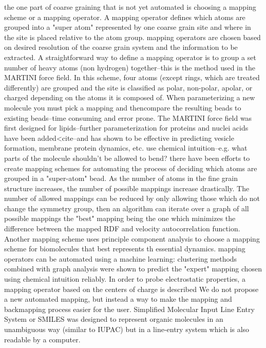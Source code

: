 the one part of coarse graining that is not yet automated is choosing a mapping scheme or a mapping operator. A mapping operator defines which atoms are grouped into a "super atom" represented by one coarse grain site and where in the site is placed relative to the atom group.
mapping operators are chosen based on desired resolution of the coarse grain system and the information to be extracted. 
A straightforward way to define a mapping operator is to group a set number of heavy atoms (non hydrogen) together--this is the method used in the MARTINI force field. \cite{Marrink2007} In this scheme, four atoms (except rings, which are treated differently) are grouped and the site is classified as polar, non-polar, apolar, or charged depending on the atoms it is composed of. When parameterizing a new molecule you must pick a mapping and thencompare the resulting beads to existing beads--time consuming and error prone.\cite{http://www.cgmartini.nl/index.php/tutorials-general-introduction-gmx5/parametrzining-new-molecule-gmx5} The MARTINI force field was first designed for lipids--further parameterization for proteins and nuclei acids have been added<cite--and has shown to be effective in predicting vesicle formation, membrane protein dynamics, etc.
use chemical intuition--e.g. what parts of the molecule shouldn't be allowed to bend?
there have been efforts to create mapping schemes for automating the process of deciding which atoms are grouped in a "super-atom" bead. 
As the number of atoms in the fine grain structure increases, the number of possible mappings increase drastically. The number of allowed mappings can be reduced by only allowing those which do not change the symmetry group, then an algorithm can iterate over a graph of all possible mappings the "best" mapping being the one which minimizes the difference between the mapped RDF and velocity autocorrelation function. \cite{Chakraborty2018a}
Another mapping scheme uses principle component analysis to choose a mapping scheme for biomolecules that best represents th essential dynamics. \cite{Zhang2008}
\cite{li2020} mapping operators can be automated using a machine learning: clustering methods combined with graph analysis were shown to predict the "expert" mapping chosen using chemical intuition reliably.
In order to probe electrostatic properties, a mapping operator based on the centers of charge is described\cite{Cao2015a}
We do not propose a new automated mapping, but instead a way to make the mapping and backmapping process easier for the user.
Simplified Molecular Input Line Entry System or SMILES \cite{Weininger} was designed to represent organic molecules in an unambiguous way (similar to IUPAC) but in a line-entry system which is also readable by a computer.
